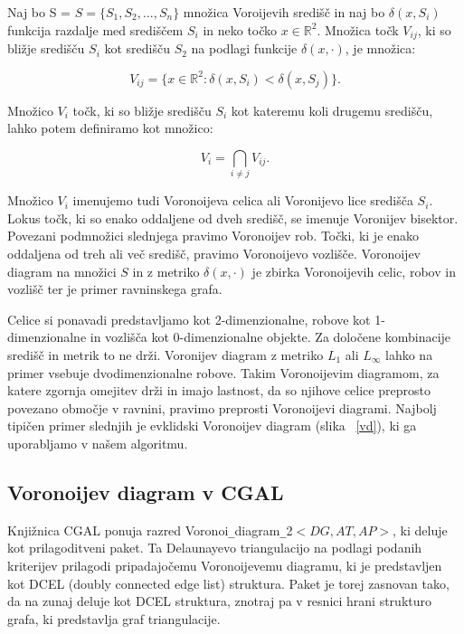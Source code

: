 \documentclass[a4paper, 12pt]{book}
\begin{document}
Naj bo S = $S = \{S_1,S_2,...,S_n\}$ množica Voroijevih središč in naj bo $\delta(x,S_i)$ funkcija razdalje med središčem $S_i$ in neko točko $x \in \mathbb{R}^2$. Množica točk $V_{ij}$, ki so bližje središču $S_i$ kot središču $S_2$ na podlagi funkcije $\delta(x,\cdot)$, je množica:

\begin{equation}
V_{ij} = \{x \in \mathbb{R}^2: \delta(x,S_i) < \delta(x,S_j)\}. 
\end{equation}

Množico $V_i$ točk, ki so bližje središču $S_i$ kot kateremu koli drugemu središču, lahko potem definiramo kot množico:

\begin{equation}
V_i = \bigcap_{i \neq j} V_{ij} .
\end{equation}



Množico $V_i$ imenujemo tudi Voronoijeva celica ali Voronijevo lice središča $S_i$. Lokus točk, ki so enako oddaljene od dveh središč, se imenuje Voronijev bisektor. Povezani podmnožici slednjega pravimo Voronoijev rob. Točki, ki je enako oddaljena od treh ali več središč, pravimo Voronoijevo vozlišče. Voronoijev diagram na množici $S$ in z metriko $\delta(x,\cdot)$ je zbirka Voronoijevih celic, robov in vozlišč ter je primer ravninskega grafa.

Celice si ponavadi predstavljamo kot 2-dimenzionalne, robove kot 1-dimenzionalne in vozlišča kot 0-dimenzionalne objekte. Za določene kombinacije središč in metrik to ne drži. Voronijev diagram z metriko $L_1$ ali $L_{\infty}$ lahko na primer vsebuje dvodimenzionalne robove. Takim Voronoijevim diagramom, za katere zgornja omejitev drži in imajo lastnost, da so njihove celice preprosto povezano območje v ravnini, pravimo preprosti Voronoijevi diagrami. Najbolj tipičen primer slednjih je evklidski Voronoijev diagram (slika ~\ref{vd}), ki ga uporabljamo v našem algoritmu.

\subsection{Voronoijev diagram v CGAL}
Knjižnica CGAL ponuja razred Voronoi\texttt{\_}diagram\texttt{\_}2$<DG,AT,AP>$, ki deluje kot prilagoditveni paket. Ta Delaunayevo triangulacijo na podlagi podanih kriterijev prilagodi pripadajočemu Voronoijevemu diagramu, ki je predstavljen kot DCEL (doubly connected edge list) struktura. Paket je torej zasnovan tako, da na zunaj deluje kot DCEL struktura, znotraj pa v resnici hrani strukturo grafa, ki predstavlja graf triangulacije.
\end{document}

